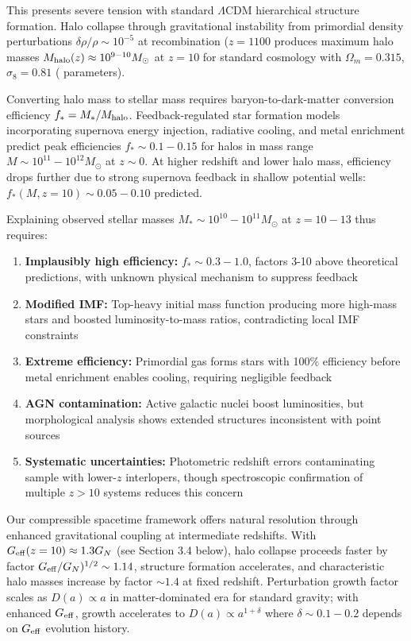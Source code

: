 \documentclass[10pt,a4paper]{article}
\providecommand{\tightlist}{\setlength{\itemsep}{0pt}\setlength{\parskip}{0pt}}
\begin{document}
This presents severe tension with standard \(\Lambda\)CDM \cite{Dodelson2021} hierarchical
structure formation. Halo collapse through gravitational instability
from primordial density perturbations \(\delta\rho/\rho \sim 10^{-5}\)
at recombination (\(z = 1100\) produces maximum halo masses
\(M_{\rm halo}(z) \approx 10^{9-10} M_\odot\) at \(z = 10\) for standard
cosmology with \(\Omega_m = 0.315\), \(\sigma_8 = 0.81\) (\cite{PlanckCollaboration2020a}
parameters).

Converting halo mass to stellar mass requires baryon-to-dark-matter
conversion efficiency \(f_* = M_*/M_{\rm halo}\). Feedback-regulated
star formation models incorporating supernova energy injection,
radiative cooling, and metal enrichment predict peak efficiencies
\(f_* \sim 0.1-0.15\) for halos in mass range
\(M \sim 10^{11}-10^{12} M_\odot\) at \(z \sim 0\). At higher redshift
and lower halo mass, efficiency drops further due to strong supernova
feedback in shallow potential wells: \(f_*(M, z=10) \sim 0.05-0.10\)
predicted.

Explaining observed stellar masses \(M_* \sim 10^{10}-10^{11} M_\odot\)
at \(z = 10-13\) thus requires:

\begin{enumerate}
\def\labelenumi{\arabic{enumi}.}
\tightlist
\item
  \textbf{Implausibly high efficiency:} \(f_* \sim 0.3-1.0\), factors
  3-10 above theoretical predictions, with unknown physical mechanism to
  suppress feedback
\item
  \textbf{Modified IMF:} Top-heavy initial mass function producing more
  high-mass stars and boosted luminosity-to-mass ratios, contradicting
  local IMF constraints
\item
  \textbf{Extreme efficiency:} Primordial gas forms stars with 100\%
  efficiency before metal enrichment enables cooling, requiring
  negligible feedback
\item
  \textbf{AGN contamination:} Active galactic nuclei boost luminosities,
  but morphological analysis shows extended structures inconsistent with
  point sources
\item
  \textbf{Systematic uncertainties:} Photometric redshift errors
  contaminating sample with lower-\(z\) interlopers, though
  spectroscopic confirmation of multiple \(z > 10\) systems reduces this
  concern
\end{enumerate}

Our compressible spacetime framework offers natural resolution through
enhanced gravitational coupling at intermediate redshifts. With
\(G_{\rm eff}(z=10) \approx 1.3 G_N\) (see Section 3.4 below), halo
collapse proceeds faster by factor
\(G_{\rm eff}/G_N)^{1/2} \sim 1.14\), structure formation accelerates,
and characteristic halo masses increase by factor \(\sim 1.4\) at fixed
redshift. Perturbation growth factor scales as \(D(a) \propto a\) in
matter-dominated era for standard gravity; with enhanced
\(G_{\rm eff}\), growth accelerates to \(D(a) \propto a^{1+\delta}\)
where \(\delta \sim 0.1-0.2\) depends on \(G_{\rm eff}\) evolution
history.
\end{document}
